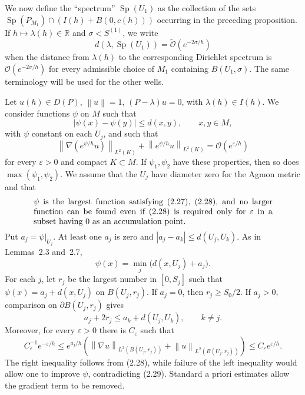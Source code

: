 \documentclass[11pt,a4paper]{article}
\newcommand{\R}{\mathbb R}
\newcommand{\Sp}{\operatorname{Sp}}
\newcommand{\cO}{\mathcal O}
\newcommand{\Ot}{\widetilde{\mathcal O}}
\newcommand{\eps}{\varepsilon}
\newcommand{\norm}[1]{\left\lVert #1\right\rVert}
\numberwithin{equation}{section}
\theoremstyle{remark}
\begin{document}
We now define the ``spectrum'' $\Sp(U_1)$ as the collection of the sets $\Sp(P_{M_1})\cap(I(h)+B(0,c(h)))$ occurring in the preceding proposition. If $h\mapsto\lambda(h)\in\R$ and $\sigma<S^{(1)}$, we write
\[
d(\lambda,\Sp(U_1))=\Ot(e^{-2\sigma/h})
\]
when the distance from $\lambda(h)$ to the corresponding Dirichlet spectrum is $\cO(e^{-2\sigma/h})$ for every admissible choice of $M_1$ containing $B(U_1,\sigma)$. The same terminology will be used for the other wells.

Let $u(h)\in D(P)$, $\norm u=1$, $(P-\lambda)u=0$, with $\lambda(h)\in I(h)$. We consider functions $\psi$ on $M$ such that
\begin{equation}
|\psi(x)-\psi(y)|\le d(x,y),\qquad x,y\in M,
\end{equation}
with $\psi$ constant on each $U_j$, and such that
\begin{equation}
\norm{\nabla(e^{\psi/h}u)}_{L^2(K)}+
\norm{e^{\psi/h}u}_{L^2(K)}=\cO(e^{\eps/h})
\end{equation}
for every $\eps>0$ and compact $K\subset M$. If $\psi_1,\psi_2$ have these properties, then so does $\max(\psi_1,\psi_2)$. We assume that the $U_j$ have diameter zero for the Agmon metric and that
\begin{equation}
\begin{minipage}{0.84\textwidth}
$\psi$ is the largest function satisfying (2.27), (2.28), and no larger function can be found even if (2.28) is required only for $\eps$ in a subset having $0$ as an accumulation point.
\end{minipage}
\end{equation}
Put $a_j=\psi|_{U_j}$. At least one $a_j$ is zero and $|a_j-a_k|\le d(U_j,U_k)$. As in Lemmas~2.3 and~2.7,
\begin{equation}
\psi(x)=\min_j\bigl(d(x,U_j)+a_j\bigr).
\end{equation}
For each $j$, let $r_j$ be the largest number in $[0,S_j]$ such that $\psi(x)=a_j+d(x,U_j)$ on $B(U_j,r_j)$. If $a_j=0$, then $r_j\ge S_0/2$. If $a_j>0$, comparison on $\partial B(U_j,r_j)$ gives
\[
a_j+2r_j\le a_k+d(U_j,U_k),\qquad k\ne j.
\]
Moreover, for every $\eps>0$ there is $C_\eps$ such that
\begin{equation}
C_\eps^{-1}e^{-\eps/h}\le
e^{a_j/h}\left(\norm{\nabla u}_{L^2(B(U_j,r_j))}+
\norm u_{L^2(B(U_j,r_j))}\right)\le C_\eps e^{\eps/h}.
\end{equation}
The right inequality follows from (2.28), while failure of the left inequality would allow one to improve $\psi$, contradicting (2.29). Standard a priori estimates allow the gradient term to be removed.
\end{document}
